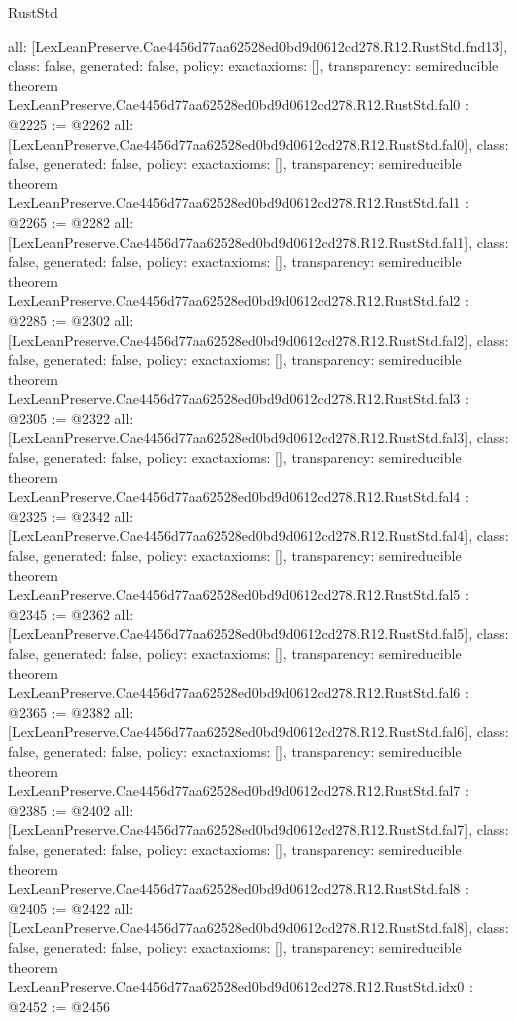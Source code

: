 \begin{lexlean}{RustStd}
\begin{coremodule}
{  all: [LexLeanPreserve.Cae4456d77aa62528ed0bd9d0612cd278.R12.RustStd.fnd13],
  class: false,
  generated: false,
  policy: exact{axioms: []},
  transparency: semireducible
}
theorem LexLeanPreserve.Cae4456d77aa62528ed0bd9d0612cd278.R12.RustStd.fal0 : @2225 := @2262 {
  all: [LexLeanPreserve.Cae4456d77aa62528ed0bd9d0612cd278.R12.RustStd.fal0],
  class: false,
  generated: false,
  policy: exact{axioms: []},
  transparency: semireducible
}
theorem LexLeanPreserve.Cae4456d77aa62528ed0bd9d0612cd278.R12.RustStd.fal1 : @2265 := @2282 {
  all: [LexLeanPreserve.Cae4456d77aa62528ed0bd9d0612cd278.R12.RustStd.fal1],
  class: false,
  generated: false,
  policy: exact{axioms: []},
  transparency: semireducible
}
theorem LexLeanPreserve.Cae4456d77aa62528ed0bd9d0612cd278.R12.RustStd.fal2 : @2285 := @2302 {
  all: [LexLeanPreserve.Cae4456d77aa62528ed0bd9d0612cd278.R12.RustStd.fal2],
  class: false,
  generated: false,
  policy: exact{axioms: []},
  transparency: semireducible
}
theorem LexLeanPreserve.Cae4456d77aa62528ed0bd9d0612cd278.R12.RustStd.fal3 : @2305 := @2322 {
  all: [LexLeanPreserve.Cae4456d77aa62528ed0bd9d0612cd278.R12.RustStd.fal3],
  class: false,
  generated: false,
  policy: exact{axioms: []},
  transparency: semireducible
}
theorem LexLeanPreserve.Cae4456d77aa62528ed0bd9d0612cd278.R12.RustStd.fal4 : @2325 := @2342 {
  all: [LexLeanPreserve.Cae4456d77aa62528ed0bd9d0612cd278.R12.RustStd.fal4],
  class: false,
  generated: false,
  policy: exact{axioms: []},
  transparency: semireducible
}
theorem LexLeanPreserve.Cae4456d77aa62528ed0bd9d0612cd278.R12.RustStd.fal5 : @2345 := @2362 {
  all: [LexLeanPreserve.Cae4456d77aa62528ed0bd9d0612cd278.R12.RustStd.fal5],
  class: false,
  generated: false,
  policy: exact{axioms: []},
  transparency: semireducible
}
theorem LexLeanPreserve.Cae4456d77aa62528ed0bd9d0612cd278.R12.RustStd.fal6 : @2365 := @2382 {
  all: [LexLeanPreserve.Cae4456d77aa62528ed0bd9d0612cd278.R12.RustStd.fal6],
  class: false,
  generated: false,
  policy: exact{axioms: []},
  transparency: semireducible
}
theorem LexLeanPreserve.Cae4456d77aa62528ed0bd9d0612cd278.R12.RustStd.fal7 : @2385 := @2402 {
  all: [LexLeanPreserve.Cae4456d77aa62528ed0bd9d0612cd278.R12.RustStd.fal7],
  class: false,
  generated: false,
  policy: exact{axioms: []},
  transparency: semireducible
}
theorem LexLeanPreserve.Cae4456d77aa62528ed0bd9d0612cd278.R12.RustStd.fal8 : @2405 := @2422 {
  all: [LexLeanPreserve.Cae4456d77aa62528ed0bd9d0612cd278.R12.RustStd.fal8],
  class: false,
  generated: false,
  policy: exact{axioms: []},
  transparency: semireducible
}
theorem LexLeanPreserve.Cae4456d77aa62528ed0bd9d0612cd278.R12.RustStd.idx0 : @2452 := @2456 {
}
\end{coremodule}
\end{lexlean}
